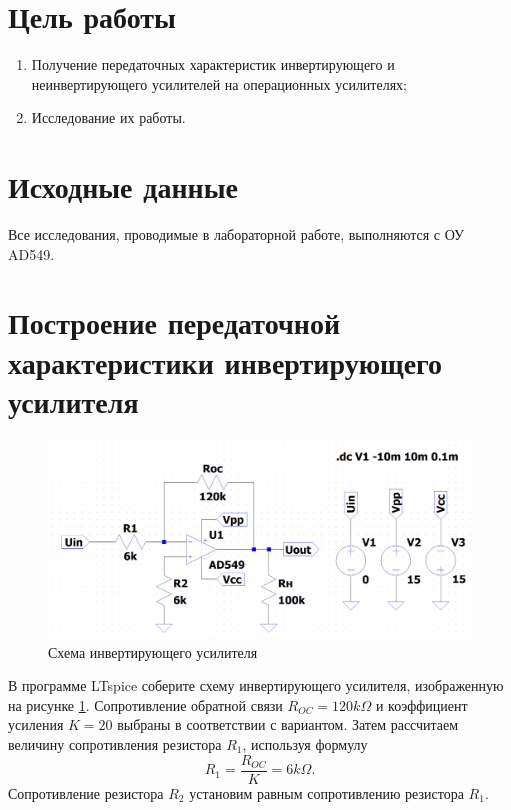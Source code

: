\section*{Цель работы}

\begin{enumerate}
    \item Получение передаточных характеристик инвертирующего и неинвертирующего усилителей на операционных усилителях;
    \item Исследование их работы.
\end{enumerate}



\section*{Исходные данные}

Все исследования, проводимые в лабораторной работе, выполняются с 
ОУ AD549.

\section*{Построение передаточной характеристики инвертирующего усилителя}

\begin{figure}[H]
    \centering
    \includegraphics[width=\textwidth]{figs/перед_хар_инв_оу_схема.png}
    \caption{Схема инвертирующего усилителя}
    \label{fig:перед_хар_инв_оу_схема}
\end{figure}

В программе LTspice соберите схему инвертирующего усилителя,
изображенную на рисунке \ref{fig:перед_хар_инв_оу_схема}. Сопротивление обратной
связи $R_{OC}=120k\Omega$ и коэффициент усиления $K=20$ выбраны в соответствии с вариантом.
Затем рассчитаем величину сопротивления резистора $R_1$, используя
формулу
\begin{equation*}
    R_1=\frac{R_{OC}}{K}=6k\Omega. 
\end{equation*}
Сопротивление резистора $R_2$ установим равным сопротивлению резистора $R_1$.


